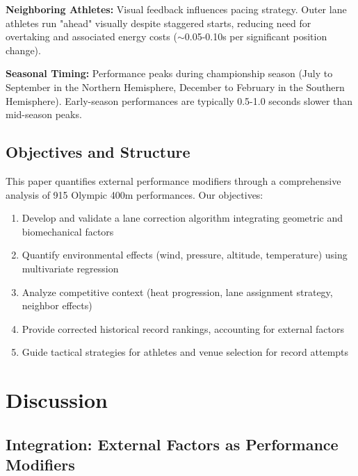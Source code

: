 \documentclass[12pt]{article}
\begin{document}
\textbf{Neighboring Athletes:} Visual feedback influences pacing strategy. Outer lane athletes run "ahead" visually despite staggered starts, reducing need for overtaking and associated energy costs ($\sim$0.05-0.10s per significant position change).

\textbf{Seasonal Timing:} Performance peaks during championship season (July to September in the Northern Hemisphere, December to February in the Southern Hemisphere). Early-season performances are typically 0.5-1.0 seconds slower than mid-season peaks.

\subsection{Objectives and Structure}

This paper quantifies external performance modifiers through a comprehensive analysis of 915 Olympic 400m performances. Our objectives:

\begin{enumerate}
    \item Develop and validate a lane correction algorithm integrating geometric and biomechanical factors
    \item Quantify environmental effects (wind, pressure, altitude, temperature) using multivariate regression
    \item Analyze competitive context (heat progression, lane assignment strategy, neighbor effects)
    \item Provide corrected historical record rankings, accounting for external factors
    \item Guide tactical strategies for athletes and venue selection for record attempts
\end{enumerate}








\section{Discussion}

\subsection{Integration: External Factors as Performance Modifiers}
\end{document}
